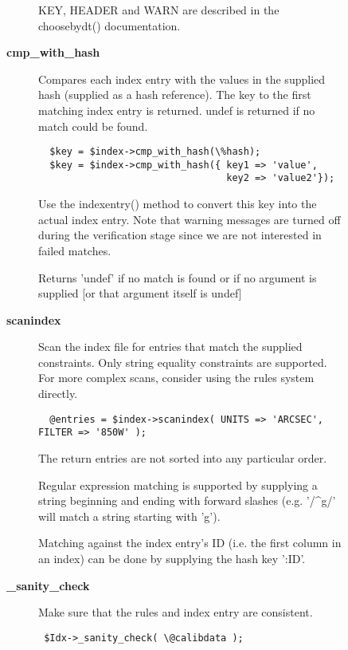 \begin{description}
\begin{description}
\begin{description}
KEY, HEADER and WARN are described in the choosebydt() documentation.


\item[{\textbf{cmp\_with\_hash}}] \mbox{}

Compares each index entry with the values in the supplied hash
(supplied as a hash reference). The key to the first matching
index entry is returned. undef is returned if no match could be
found.

\begin{verbatim}
  $key = $index->cmp_with_hash(\%hash);
  $key = $index->cmp_with_hash({ key1 => 'value',
                                 key2 => 'value2'});
\end{verbatim}


Use the indexentry() method to convert this key into the actual
index entry. Note that warning messages are turned off during the
verification stage since we are not interested in failed matches.



Returns 'undef' if no match is found or if no argument is supplied
[or that argument itself is undef]


\item[{\textbf{scanindex}}] \mbox{}

Scan the index file for entries that match the supplied constraints.
Only string equality constraints are supported. For more complex scans,
consider using the rules system directly.

\begin{verbatim}
  @entries = $index->scanindex( UNITS => 'ARCSEC', FILTER => '850W' );
\end{verbatim}


The return entries are not sorted into any particular order.



Regular expression matching is supported by supplying a string
beginning and ending with forward slashes (e.g. '/\^{}g/' will match a
string starting with 'g').



Matching against the index entry's ID (i.e. the first column in an
index) can be done by supplying the hash key ':ID'.


\item[{\textbf{\_sanity\_check}}] \mbox{}

Make sure that the rules and index entry are consistent.

\begin{verbatim}
 $Idx->_sanity_check( \@calibdata );
\end{verbatim}



\end{description}
\end{description}
\end{description}
